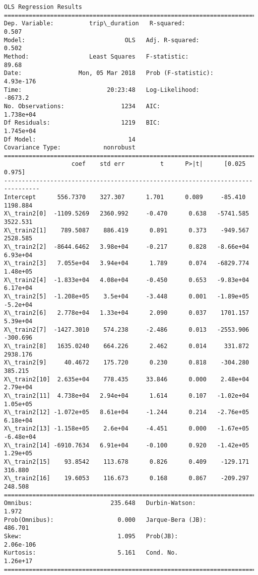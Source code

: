 \documentclass[11pt]{article}
\begin{document}
    \begin{Verbatim}[commandchars=\\\{\}]
                            OLS Regression Results                            
==============================================================================
Dep. Variable:          trip\_duration   R-squared:                       0.507
Model:                            OLS   Adj. R-squared:                  0.502
Method:                 Least Squares   F-statistic:                     89.68
Date:                Mon, 05 Mar 2018   Prob (F-statistic):          4.93e-176
Time:                        20:23:48   Log-Likelihood:                -8673.2
No. Observations:                1234   AIC:                         1.738e+04
Df Residuals:                    1219   BIC:                         1.745e+04
Df Model:                          14                                         
Covariance Type:            nonrobust                                         
================================================================================
                   coef    std err          t      P>|t|      [0.025      0.975]
--------------------------------------------------------------------------------
Intercept      556.7370    327.307      1.701      0.089     -85.410    1198.884
X\_train2[0]  -1109.5269   2360.992     -0.470      0.638   -5741.585    3522.531
X\_train2[1]    789.5087    886.419      0.891      0.373    -949.567    2528.585
X\_train2[2]  -8644.6462   3.98e+04     -0.217      0.828   -8.66e+04    6.93e+04
X\_train2[3]   7.055e+04   3.94e+04      1.789      0.074   -6829.774    1.48e+05
X\_train2[4]  -1.833e+04   4.08e+04     -0.450      0.653   -9.83e+04    6.17e+04
X\_train2[5]  -1.208e+05    3.5e+04     -3.448      0.001   -1.89e+05    -5.2e+04
X\_train2[6]   2.778e+04   1.33e+04      2.090      0.037    1701.157    5.39e+04
X\_train2[7]  -1427.3010    574.238     -2.486      0.013   -2553.906    -300.696
X\_train2[8]   1635.0240    664.226      2.462      0.014     331.872    2938.176
X\_train2[9]     40.4672    175.720      0.230      0.818    -304.280     385.215
X\_train2[10]  2.635e+04    778.435     33.846      0.000    2.48e+04    2.79e+04
X\_train2[11]  4.738e+04   2.94e+04      1.614      0.107   -1.02e+04    1.05e+05
X\_train2[12] -1.072e+05   8.61e+04     -1.244      0.214   -2.76e+05    6.18e+04
X\_train2[13] -1.158e+05    2.6e+04     -4.451      0.000   -1.67e+05   -6.48e+04
X\_train2[14] -6910.7634   6.91e+04     -0.100      0.920   -1.42e+05    1.29e+05
X\_train2[15]    93.8542    113.678      0.826      0.409    -129.171     316.880
X\_train2[16]    19.6053    116.673      0.168      0.867    -209.297     248.508
==============================================================================
Omnibus:                      235.648   Durbin-Watson:                   1.972
Prob(Omnibus):                  0.000   Jarque-Bera (JB):              486.701
Skew:                           1.095   Prob(JB):                    2.06e-106
Kurtosis:                       5.161   Cond. No.                     1.26e+17
==============================================================================


\end{Verbatim}
\end{document}
